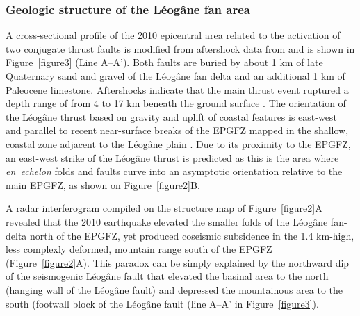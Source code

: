 \documentclass[linenumbers,draft]{agujournal}
\begin{document}
\subsubsection{Geologic structure of the L\'eog\^ane fan area}
A cross-sectional profile of the 2010 epicentral area related to the activation of two conjugate thrust faults is modified from aftershock data from \citet{douilly2013crustal,douilly2015three} and is shown in Figure~\ref{figure3} (Line A--A'). Both faults are buried by about 1 km of late Quaternary sand and gravel of the L\'eog\^ane fan delta \citep{kocel2016near} and an additional 1 km of Paleocene limestone. Aftershocks indicate that the main thrust event ruptured a depth range of from 4 to 17 km beneath the ground surface \citep{douilly2013crustal,douilly2015three}. The orientation of the L\'eog\^ane thrust based on gravity and uplift of coastal features is east-west and parallel to recent near-surface breaks of the EPGFZ mapped in the shallow, coastal zone adjacent to the L\'eog\^ane plain \citep{hornbach2010high}. Due to its proximity to the EPGFZ, an east-west strike of the L\'eog\^ane thrust is predicted as this is the area where \textit{en~echelon} folds and faults curve into an asymptotic orientation relative to the main EPGFZ, as shown on Figure~\ref{figure2}B.

A radar interferogram compiled on the structure map of Figure~\ref{figure2}A revealed that the 2010 earthquake elevated the smaller folds of the L\'eog\^ane fan-delta north of the EPGFZ, yet produced coseismic subsidence in the 1.4 km-high, less complexly deformed, mountain range south of the EPGFZ \citep{hashimoto2011fan} (Figure~\ref{figure2}A). This paradox can be simply explained by the northward dip of the seismogenic L\'eog\^ane fault that elevated the basinal area to the north (hanging wall of the L\'eog\^ane fault) and depressed the mountainous area to the south (footwall block of the L\'eog\^ane fault (line A--A' in Figure~\ref{figure3}). 
\end{document}
